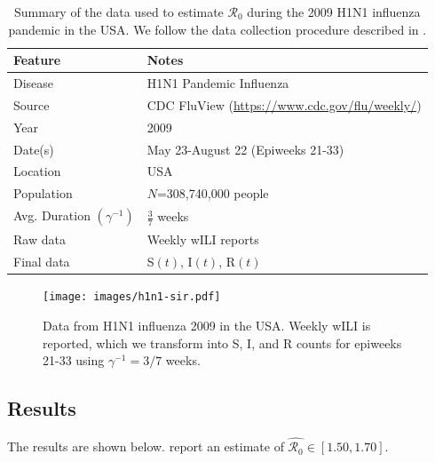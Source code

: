 \documentclass[12pt]{article}
\newcommand{\rr}{\ensuremath{\mathcal{R}_0}}
\begin{document}
\begin{table}[H]
\centering
\begin{tabular}{@{}ll@{}}
\toprule
Feature       & Notes                                                                   \\ \midrule
Disease       & H1N1 Pandemic Influenza                                                 \\
Source        & CDC FluView (\url{https://www.cdc.gov/flu/weekly/})      \\
Year          & 2009                                                                    \\
Date(s)          & May 23-August 22 (Epiweeks 21-33)                                       \\
Location      & USA                                                                     \\
Population    & $N$=308,740,000 people                                                  \\
  Avg. Duration $\left ( \gamma^{-1}\right )$ & $\frac{3}{7}$ weeks\\
  Raw data & Weekly wILI reports\\
  Final data & S$(t)$, I$(t)$, R$(t)$ \\\bottomrule
\end{tabular}
\caption{Summary of the data used to estimate $\rr$ during the 2009 H1N1 influenza pandemic in the USA.  We follow the data collection procedure described in \cite{towers2009}.}
\label{tab:h1n1-data}
\end{table}

\begin{figure}[H]
  \centering
  \texttt{[image: images/h1n1-sir.pdf]}
  \caption{Data from H1N1 influenza 2009 in the USA.  Weekly wILI is reported, which we transform into S, I, and R counts for epiweeks 21-33 using $\gamma^{-1} = 3/7$ weeks.}
  \end{figure}
      

      \subsection{Results}
      The results are shown below.  \cite{towers2009} report an estimate of $\hat{\rr} \in [1.50, 1.70]$.
\end{document}
